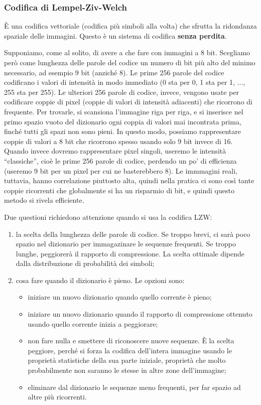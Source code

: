 \documentclass[a4paper,11pt]{article}
\begin{document}
\subsubsection{Codifica di Lempel-Ziv-Welch}
È una codifica vettoriale (codifica più simboli alla volta) che sfrutta la ridondanza spaziale delle immagini.
Questo è un sistema di codifica \textbf{senza perdita}.
\par
Supponiamo, come al solito, di avere a che fare con immagini a 8 bit. Scegliamo però come lunghezza delle parole del codice un numero di bit più alto del minimo necessario, ad esempio 9 bit (anziché 8).
Le prime 256 parole del codice codificano i valori di intensità in modo immediato (0 sta per 0, 1 sta per 1, ..., 255 sta per 255). Le ulteriori 256 parole di codice, invece, vengono usate per codificare
coppie di pixel (coppie di valori di intensità adiacenti) che ricorrono di frequente. Per trovarle, si scansiona l'immagine riga per riga, e si inserisce nel primo spazio vuoto del dizionario
ogni coppia di valori mai incontrata prima, finché tutti gli spazi non sono pieni. In questo modo, possiamo rappresentare coppie di valori a 8 bit che ricorrono spesso usando solo 9 bit invece di 16.
Quando invece dovremo rappresentare pixel singoli, useremo le intensità ``classiche'', cioè le prime 256 parole di codice, perdendo un po' di efficienza (useremo 9 bit per un pixel per cui ne basterebbero 8).
Le immmagini reali, tuttavia, hanno correlazione piuttosto alta, quindi nella pratica ci sono così tante coppie ricorrenti che globalmente si ha un risparmio di bit, e quindi questo metodo si rivela efficiente.
\par
Due questioni richiedono attenzione quando si usa la codifica LZW:
\begin{enumerate}
    \item la scelta della lunghezza delle parole di codice. Se troppo brevi, ci sarà poco spazio nel dizionario per immagazinare le sequenze frequenti. Se troppo lunghe, peggiorerà il rapporto di compressione. La
    scelta ottimale dipende dalla distribuzione di probabilità dei simboli;
    \item cosa fare quando il dizionario è pieno. Le opzioni sono:
    \begin{itemize}
        \item iniziare un nuovo dizionario quando quello corrente è pieno;
        \item iniziare un nuovo dizionario quando il rapporto di compressione ottenuto usando quello corrente
        inizia a peggiorare;
        \item non fare nulla e smettere di riconoscere nuove sequenze. È la scelta peggiore, perché si forza la codifica dell'intera immagine usando le proprietà statistiche della sua parte iniziale, proprietà
        che molto probabilmente non saranno le stesse in altre zone dell'immagine;
        \item eliminare dal dizionario le sequenze meno frequenti, per far spazio ad altre più ricorrenti.
    \end{itemize}
\end{enumerate}
\end{document}
